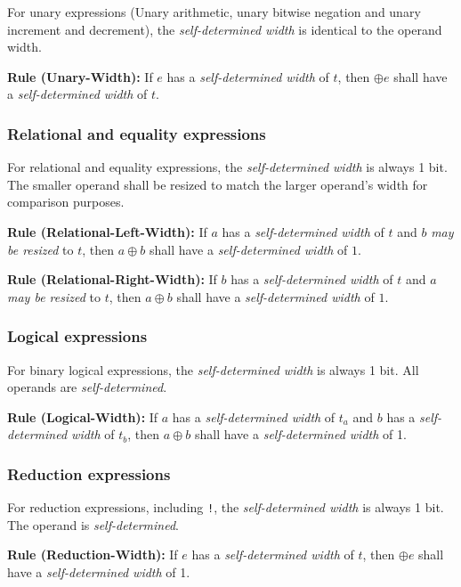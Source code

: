 \documentclass{article}
\newcommand{\sds}{\emph{self-determined width}}
\newcommand{\mbr}{\emph{may be resized}}
\newenvironment{typingrule}[1]%
{\par\noindent\textbf{Rule (#1):} }%
{\par}
\begin{document}
For unary expressions (Unary arithmetic, unary bitwise negation and unary
increment and decrement), the \sds{} is identical to the
operand width.

\begin{typingrule}{Unary-Width}
  If $e$ has a \sds{} of $t$, then $\oplus e$ shall have
  a \sds{} of $t$.
\end{typingrule}

\subsubsection{Relational and equality expressions}%

For relational and equality expressions, the \sds{} is
always 1 bit. The smaller operand shall be resized to match the larger operand's
width for comparison purposes.

\begin{typingrule}{Relational-Left-Width}
  If $a$ has a \sds{} of $t$ and $b$ \mbr{}
  to $t$, then $a \oplus b$ shall have a \sds{} of $1$.
\end{typingrule}

\begin{typingrule}{Relational-Right-Width}
  If $b$ has a \sds{} of $t$ and $a$ \mbr{}
  to $t$, then $a \oplus b$ shall have a \sds{} of $1$.
\end{typingrule}

\subsubsection{Logical expressions}%

For binary logical expressions, the \sds{} is always 1 bit.
All operands are \emph{self-determined}.

\begin{typingrule}{Logical-Width}
  If $a$ has a \sds{} of $t_{a}$ and $b$ has a
  \sds{} of $t_{b}$, then $a \oplus b$ shall have a
  \sds{} of 1.
\end{typingrule}

\subsubsection{Reduction expressions}%

For reduction expressions, including \texttt{!}, the \sds{}
is always 1 bit. The operand is \emph{self-determined}.

\begin{typingrule}{Reduction-Width}
  If $e$ has a \sds{} of $t$, then $\oplus e$ shall have a
  \sds{} of 1.
\end{typingrule}
\end{document}
